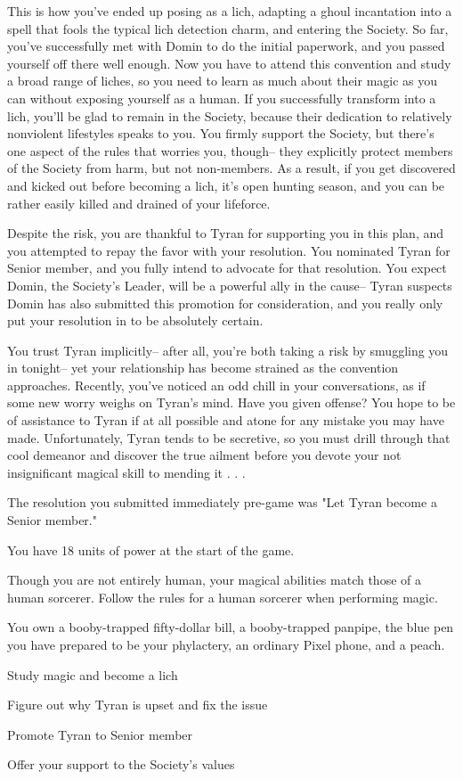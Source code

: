 \documentclass[char]{Sel}
\begin{document}
This is how you've ended up posing as a lich, adapting a ghoul incantation into a spell that fools the typical lich detection charm, and entering the Society. So far, you've successfully met with Domin to do the initial paperwork, and you passed yourself off there well enough. Now you have to attend this convention and study a broad range of liches, so you need to learn as much about their magic as you can without exposing yourself as a human. If you successfully transform into a lich, you'll be glad to remain in the Society, because their dedication to relatively nonviolent lifestyles speaks to you. You firmly support the Society, but there's one aspect of the rules that worries you, though-- they explicitly protect members of the Society from harm, but not non-members. As a result, if you get discovered and kicked out before becoming a lich, it's open hunting season, and you can be rather easily killed and drained of your lifeforce.

Despite the risk, you are thankful to Tyran for supporting you in this plan, and you attempted to repay the favor with your resolution. You nominated Tyran for Senior member, and you fully intend to advocate for that resolution. You expect Domin, the Society’s Leader, will be a powerful ally in the cause-- Tyran suspects Domin has also submitted this promotion for consideration, and you really only put your resolution in to be absolutely certain.

You trust Tyran implicitly-- after all, you're both taking a risk by smuggling you in tonight-- yet your relationship has become strained as the convention approaches. Recently, you've noticed an odd chill in your conversations, as if some new worry weighs on Tyran's mind. Have you given offense? You hope to be of assistance to Tyran if at all possible and atone for any mistake you may have made. Unfortunately, Tyran tends to be secretive, so you must drill through that cool demeanor and discover the true ailment before you devote your not insignificant magical skill to mending it . . .

\begin{itemz}[Notes]
  \item The resolution you submitted immediately pre-game was "Let Tyran become a Senior member."
      \item You have 18 units of power at the start of the game.
   \item Though you are not entirely human, your magical abilities match those of a human sorcerer. Follow the rules for a human sorcerer when performing magic.
   \item You own a booby-trapped fifty-dollar bill, a booby-trapped panpipe, the blue pen you have prepared to be your phylactery, an ordinary Pixel phone, and a peach.
    \end{itemz}
   
  
    
 \begin{itemz}[Goals]
\item Study magic and become a lich
\item Figure out why Tyran is upset and fix the issue
\item Promote Tyran to Senior member 
\item Offer your support to the Society's values
\end{itemz}
\end{document}
